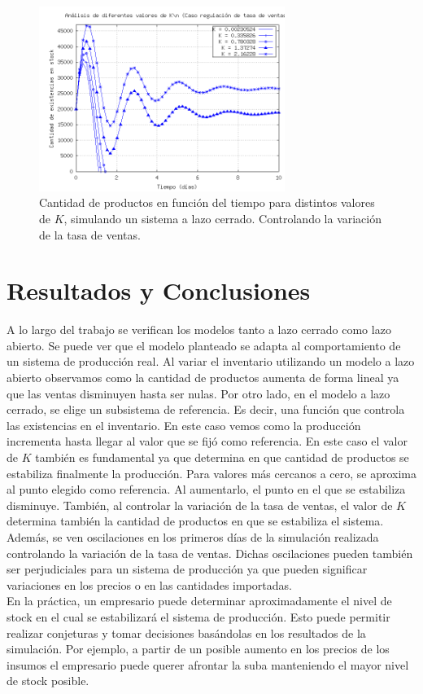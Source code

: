 \documentclass{sig-alternate}
\begin{document}
\begin{figure}[h]
\begin{center}
\includegraphics[width=8cm]{../src/k_plot2.png}
\caption{\label{fig:lazo_cerrado_var_tventas2}Cantidad de productos en función del tiempo para distintos valores de $K$, simulando un sistema
a lazo cerrado. Controlando la variación de la tasa de ventas.}
\end{center}
\end{figure}

\newpage

\section{Resultados y Conclusiones}
\label{results_and_conclusions_section}
A lo largo del trabajo se verifican los modelos tanto a lazo cerrado como lazo abierto. Se puede ver que el modelo planteado se adapta al comportamiento de un sistema de producción real. Al variar el inventario utilizando un modelo a lazo abierto observamos como la cantidad de productos aumenta de
forma lineal ya que las ventas disminuyen hasta ser nulas.  Por otro lado, en el modelo a lazo cerrado, se elige un subsistema de referencia.
Es decir, una función que controla las existencias en el inventario. En este caso vemos como la producción incrementa hasta llegar al valor 
que se fijó como referencia. En este caso el valor de $K$ también es fundamental ya que determina
en que cantidad de productos se estabiliza finalmente la producción. Para valores más cercanos a cero, se aproxima al punto
elegido como referencia. Al aumentarlo, el punto en el que se estabiliza disminuye. También, al controlar la variación de la tasa de ventas,
el valor de $K$ determina también la cantidad de productos en que se estabiliza el sistema.\\
Además, se ven oscilaciones en los primeros días de la simulación realizada controlando la variación de la tasa de ventas. Dichas oscilaciones
pueden también ser perjudiciales para un sistema de producción ya que pueden significar variaciones en los precios o en las cantidades importadas.\\
En la práctica, un empresario puede determinar aproximadamente el nivel de stock en el cual se 
estabilizará el sistema de producción. Esto puede permitir realizar conjeturas y tomar decisiones basándolas en los resultados de la simulación.
Por ejemplo, a partir de un posible aumento en los precios de los insumos el empresario puede querer afrontar la suba manteniendo el
mayor nivel de stock posible. 


\nocite{*}

\end{document}
